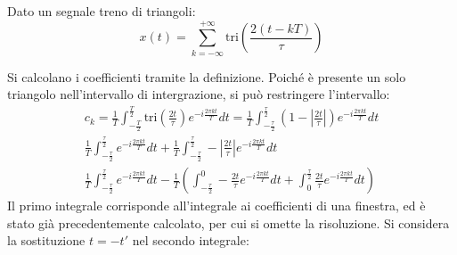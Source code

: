 \documentclass{article}
\numberwithin{equation}{subsection}
\begin{document}
Dato un segnale treno di triangoli:
\begin{equation*}
    x(t)=\displaystyle\sum_{k=-\infty}^{+\infty}\mbox{tri}\left(\frac{2(t-kT)}{\tau}\right)
\end{equation*}
\begin{center}
\end{center}
Si calcolano i coefficienti tramite la definizione. Poiché è presente un solo triangolo nell'intervallo di intergrazione, si può restringere l'intervallo: 
\begin{gather*}
    c_k=\displaystyle\frac{1}{T}\int_{-\frac{T}{2}}^{\frac{T}{2}}\mbox{tri}\left(\frac{2t}{\tau}\right)e^{-i\frac{2\pi kt}{T}}dt=\frac{1}{T}\int_{-\frac{\tau}{2}}^{\frac{\tau}{2}}\left(1-\left|\frac{2t}{\tau}\right|\right)e^{-i\frac{2\pi kt}{T}}dt\\
    \displaystyle\frac{1}{T}\int_{-\frac{\tau}{2}}^{\frac{\tau}{2}}e^{-i\frac{2\pi kt}{T}}dt+\frac{1}{T}\int_{-\frac{\tau}{2}}^{\frac{\tau}{2}}-\left|\frac{2t}{\tau}\right|e^{-i\frac{2\pi kt}{T}}dt\\
    \displaystyle\frac{1}{T}\int_{-\frac{\tau}{2}}^{\frac{\tau}{2}}e^{-i\frac{2\pi kt}{T}}dt-\frac{1}{T}\left(\int_{-\frac{\tau}{2}}^{0}-\frac{2t}{\tau}e^{-i\frac{2\pi kt}{T}}dt+\int_{0}^{\frac{\tau}{2}}\frac{2t}{\tau}e^{-i\frac{2\pi kt}{T}}dt\right)
\end{gather*}
Il primo integrale corrisponde all'integrale ai coefficienti di una finestra, ed è stato già precedentemente calcolato, per cui si omette la risoluzione. Si considera la 
sostituzione $t=-t'$ nel secondo integrale:
\end{document}
